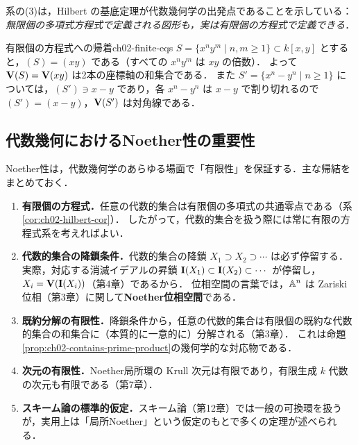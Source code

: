 系の(3)は，Hilbert の基底定理が代数幾何学の出発点であることを示している：\emph{無限個の多項式方程式で定義される図形も，実は有限個の方程式で定義できる}．

\begin{myex}{有限個の方程式への帰着}{ch02-finite-eqs}
$S=\{x^ny^m\mid n,m\ge1\}\subset k[x,y]$ とすると，$(S)=(xy)$ である（すべての $x^ny^m$ は $xy$ の倍数）．
よって $\mathbf{V}(S)=\mathbf{V}(xy)$ は2本の座標軸の和集合である．
また $S'=\{x^n-y^n\mid n\ge1\}$ については，$(S')\ni x-y$ であり，各 $x^n-y^n$ は $x-y$ で割り切れるので $(S')=(x-y)$，$\mathbf{V}(S')$ は対角線である．
\end{myex}

\subsection{代数幾何におけるNoether性の重要性}

Noether性は，代数幾何学のあらゆる場面で「有限性」を保証する．主な帰結をまとめておく．

\begin{enumerate}
  \item \textbf{有限個の方程式．}任意の代数的集合は有限個の多項式の共通零点である（系\ref{cor:ch02-hilbert-cor}）．
        したがって，代数的集合を扱う際には常に有限の方程式系を考えればよい．
  \item \textbf{代数的集合の降鎖条件．}代数的集合の降鎖 $X_1\supset X_2\supset\cdots$ は必ず停留する．
        実際，対応する消滅イデアルの昇鎖 $\mathbf{I}(X_1)\subset\mathbf{I}(X_2)\subset\cdots$ が停留し，$X_i=\mathbf{V}(\mathbf{I}(X_i))$（第4章）であるから．
        位相空間の言葉では，$\mathbb{A}^n$ は Zariski 位相（第3章）に関して\textbf{Noether位相空間}である．
  \item \textbf{既約分解の有限性．}降鎖条件から，任意の代数的集合は有限個の既約な代数的集合の和集合に（本質的に一意的に）分解される（第3章）．
        これは命題\ref{prop:ch02-contains-prime-product}の幾何学的な対応物である．
  \item \textbf{次元の有限性．}Noether局所環の Krull 次元は有限であり，有限生成 $k$ 代数の次元も有限である（第7章）．
  \item \textbf{スキーム論の標準的仮定．}スキーム論（第12章）では一般の可換環を扱うが，実用上は「局所Noether」という仮定のもとで多くの定理が述べられる．
\end{enumerate}

